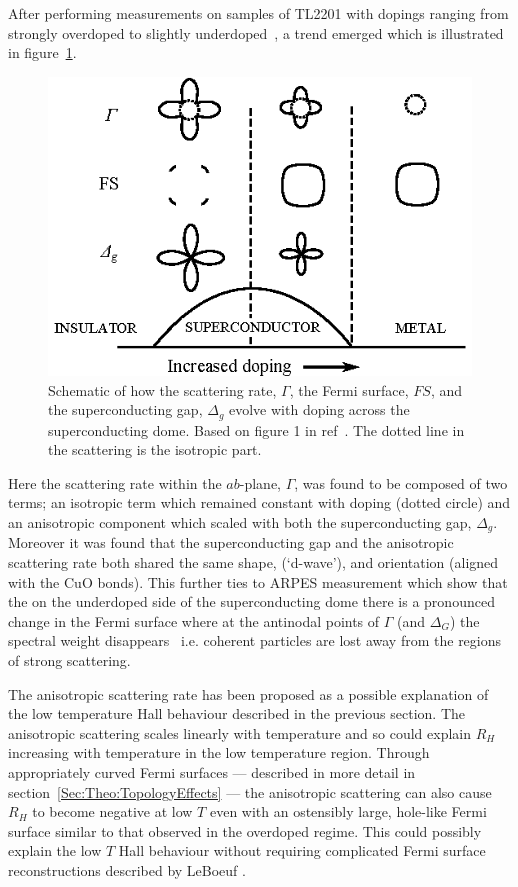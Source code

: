 After performing measurements on samples of \ac{TL2201} with dopings ranging from strongly overdoped to slightly underdoped~\cite{Abdel-Jawad2006}, a trend emerged which is illustrated in figure~\ref{Fig:Intro:AnisotropyPhase}. 
\begin{figure}[htbp]
    \begin{center}
        \includegraphics[scale=1.2]{Chapter-Introduction/Figures/AnisotropyPhase/AnisotropyPhase}
        \caption{Schematic of how the scattering rate, $\Gamma$, the Fermi surface, $FS$, and the superconducting gap, $\Delta_g$ evolve with doping across the superconducting dome. Based on figure 1 in ref~\cite{Taillefer2006}. The dotted line in the scattering is the isotropic part.}
        \label{Fig:Intro:AnisotropyPhase}
    \end{center}
\end{figure}
Here the scattering rate within the $ab$-plane, $\Gamma$, was found to be composed of two terms; an isotropic term which remained constant with doping (dotted circle) and an anisotropic component which scaled with both the superconducting gap, $\Delta_g$. Moreover it was found that the superconducting gap and the anisotropic scattering rate both shared the same shape, (`d-wave'), and orientation (aligned with the CuO bonds). This further ties to \ac{ARPES} measurement which show that the on the underdoped side of the superconducting dome there is a pronounced change in the Fermi surface where at the antinodal points of $\Gamma$ (and $\Delta_G$) the spectral weight disappears~\cite{Norman2010} i.e. coherent particles are lost away from the regions of strong scattering.

The anisotropic scattering rate has been proposed as a possible explanation of the low temperature Hall behaviour described in the previous section. The anisotropic scattering scales linearly with temperature and so could explain $R_H$ increasing with temperature in the low temperature region. Through appropriately curved Fermi surfaces --- described in more detail in section~\ref{Sec:Theo:TopologyEffects} --- the anisotropic scattering can also cause $R_H$ to become negative at low $T$ even with an ostensibly large, hole-like Fermi surface similar to that observed in the overdoped regime. This could possibly explain the low $T$ Hall behaviour without requiring complicated Fermi surface reconstructions described by LeBoeuf \etal.

